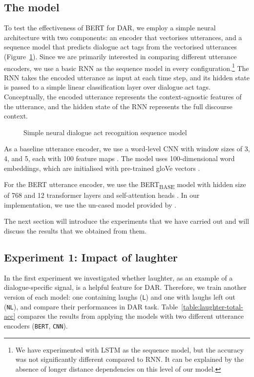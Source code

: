 \documentclass[11pt,a4paper]{article}
\begin{document}
\subsection{The model}
\label{sec:model}
To test the effectiveness of BERT for DAR, we employ a simple neural architecture with two components: an encoder that vectorises utterances, and a sequence model that predicts dialogue act tags from the vectorised utterances (Figure~\ref{fig:model-architecture}).
Since we are primarily interested in comparing different utterance encoders, we use a basic RNN as the sequence model in every configuration.\footnote{We have experimented with LSTM as the sequence model, but the accuracy was not significantly different compared to RNN. It can be explained by the absence of longer distance dependencies on this level of our model.} 
The RNN takes the encoded utterance as input at each time step,
and its hidden state is passed to a simple linear classification layer over dialogue act tags.
Conceptually, the encoded utterance represents the context-agnostic features of the utterance, and the hidden state of the RNN represents the full discourse context.

\begin{figure}
  
  \caption{Simple neural dialogue act recognition sequence model}
  \label{fig:model-architecture}
\end{figure}

As a baseline utterance encoder, we use a word-level CNN with window sizes of 3, 4, and 5, each with 100 feature maps \citep{kimConvolutionalNeuralNetworks2014}. 
The model uses 100-dimensional word embeddings, which are initialised with pre-trained gloVe vectors \citep{penningtonGloveGlobalVectors2014}.

For the BERT utterance encoder, we use the BERT\textsubscript{BASE} model with hidden size of 768 and 12 transformer layers and self-attention heads \citep[][\S3.1]{devlinBERTPretrainingDeep2018}.
In our implementation, we use the un-cased model provided by \citet{wolfHuggingFaceTransformersStateoftheart2019}.

The next section will introduce the experiments that we have carried out and will discuss the results that we obtained from them.

\subsection{Experiment 1: Impact of laughter} \label{sec:experiment1}   %
In the first experiment we investigated whether laughter, as an example of a dialogue-specific signal, is a helpful feature for DAR.
Therefore, we train another version of each model: one containing laughs (\texttt{L}) and one with laughs left out (\texttt{NL}), and compare their performances in DAR task.
Table~\ref{table:laughter-total-acc} compares the results from applying the models with two different utterance encoders (\texttt{BERT}, \texttt{CNN}).
\end{document}
